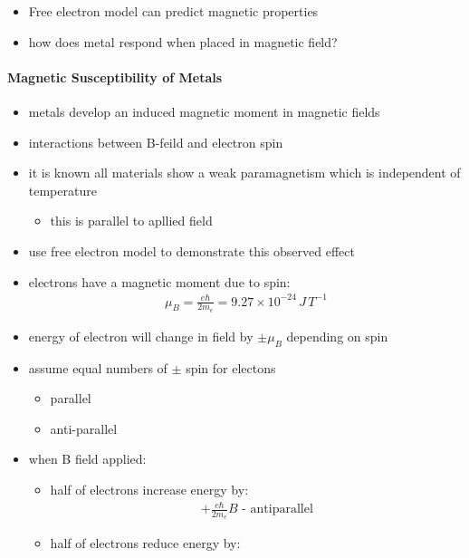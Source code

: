 \documentclass[a4paper,11pt,normalem]{article}
\begin{document}
\begin{itemize}
    \item Free electron model can predict magnetic properties
    \item how does metal respond when placed in magnetic field?
\end{itemize}

\paragraph{Magnetic Susceptibility of Metals}

\begin{itemize}
    \item metals develop an induced magnetic moment in magnetic fields
    \item interactions between B-feild and electron spin
    \item it is known all materials show a weak paramagnetism which is independent of temperature
        \begin{itemize}
            \item this is parallel to apllied field
        \end{itemize}
    \item use free electron model to demonstrate this observed effect
    \item electrons have a magnetic moment due to spin:
        \begin{align*}
            \mu_B = \frac{e\hbar}{2m_e} = 9.27\times10^{-24}\,J\,T^{-1}
        \end{align*}
    \item energy of electron will change in field by \(\pm \mu_B\) depending on spin
    \item assume equal numbers of \(\pm\) spin for electons
        \begin{itemize}
            \item parallel
            \item anti-parallel
        \end{itemize}
    \item when B field applied:
        \begin{itemize}
            \item half of electrons increase energy by:
                \begin{align*}
                    + \frac{e\hbar}{2m_e}B \text{ - antiparallel}
                \end{align*}
            \item half of electrons reduce energy by:

\end{itemize}
\end{itemize}
\end{document}
